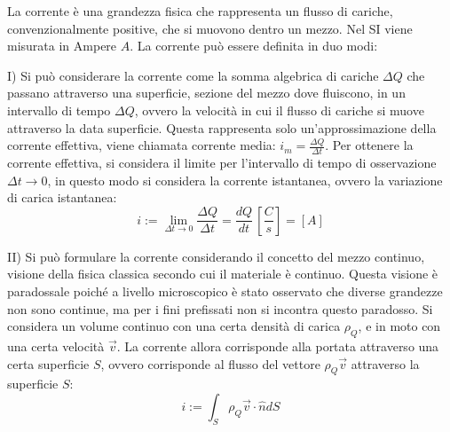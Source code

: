\documentclass{article}
\numberwithin{equation}{subsection}
\begin{document}
La corrente è una grandezza fisica che rappresenta un flusso di cariche, convenzionalmente positive, che si muovono dentro un mezzo. Nel SI viene misurata in Ampere $A$. 
La corrente può essere definita in duo modi:  


I) Si può considerare la corrente come la somma algebrica di cariche $\Delta Q$ che passano attraverso una superficie, sezione del 
mezzo dove fluiscono, in un intervallo di tempo $\Delta Q$, ovvero la velocità in cui il flusso di cariche si muove attraverso la data superficie. Questa rappresenta solo 
un'approssimazione della corrente effettiva, viene chiamata corrente media: $i_m=\displaystyle\frac{\Delta Q}{\Delta t}$. Per ottenere la corrente effettiva, si considera il 
limite per l'intervallo di tempo di osservazione $\Delta t\to0$, in questo modo si considera la corrente istantanea, ovvero la variazione di carica istantanea:
\begin{equation}
    i:=\lim_{\Delta t\to0}\displaystyle\frac{\Delta Q}{\Delta t}=\frac{dQ}{dt}\,\left[\frac{C}{s}\right]=[A]
\end{equation}  

II) Si può formulare la corrente considerando il concetto del mezzo continuo, visione della fisica classica secondo cui il materiale è continuo. Questa visione è paradossale 
poiché a livello microscopico è stato osservato che diverse grandezze non sono continue, ma per i fini prefissati non si incontra questo paradosso. Si considera un volume 
continuo con una certa densità di carica $\rho_Q$, e in moto con una certa velocità $\vec{v}$. La corrente allora corrisponde alla portata attraverso una certa superficie $S$, 
ovvero corrisponde al flusso del vettore $\rho_Q\vec{v}$ attraverso la superficie $S$: 
\begin{equation}
    i:=\displaystyle\int_S\rho_Q\vec{v}\cdot\hat{n}dS
\end{equation}

\begin{center}
\end{center}
\end{document}
